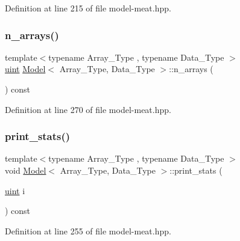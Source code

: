 Definition at line 215 of file model-\/meat.\+hpp.

\mbox{\label{class_model_a35678412d71c9f96aa19099c72179f3d}} 
\subsubsection{\texorpdfstring{n\+\_\+arrays()}{n\_arrays()}}
{\footnotesize\ttfamily template$<$typename Array\+\_\+\+Type , typename Data\+\_\+\+Type $>$ \\
\hyperlink{typedefs_8hpp_a91ad9478d81a7aaf2593e8d9c3d06a14}{uint} \hyperlink{class_model}{Model}$<$ Array\+\_\+\+Type, Data\+\_\+\+Type $>$\+::n\+\_\+arrays (\begin{DoxyParamCaption}{ }\end{DoxyParamCaption}) const\hspace{0.3cm}{\ttfamily [inline]}}



Definition at line 270 of file model-\/meat.\+hpp.

\mbox{\label{class_model_a1109a7cacf9993aa3189240bc41d5bec}} 
\subsubsection{\texorpdfstring{print\+\_\+stats()}{print\_stats()}}
{\footnotesize\ttfamily template$<$typename Array\+\_\+\+Type , typename Data\+\_\+\+Type $>$ \\
void \hyperlink{class_model}{Model}$<$ Array\+\_\+\+Type, Data\+\_\+\+Type $>$\+::print\+\_\+stats (\begin{DoxyParamCaption}\item[{\hyperlink{typedefs_8hpp_a91ad9478d81a7aaf2593e8d9c3d06a14}{uint}}]{i }\end{DoxyParamCaption}) const\hspace{0.3cm}{\ttfamily [inline]}}



Definition at line 255 of file model-\/meat.\+hpp.

\mbox{\label{class_model_aee8f9832e77a43f29b3767ae91b9a0ad}} 
